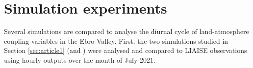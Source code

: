 

\section{Simulation experiments}

Several simulations are compared to analyse the diurnal cycle of land-atmosphere coupling variables in the Ebro Valley.
First, the two simulations studied in Section \ref{sec:article1} (\noirr and \irr) were analysed and compared to LIAISE observations using hourly outputs over the month of July 2021.


